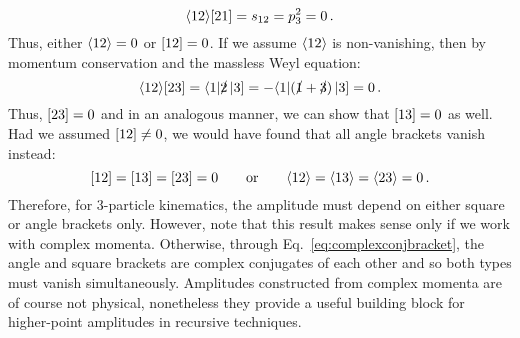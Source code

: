 \documentclass[main.tex]{subfiles}
\begin{document}
\begin{equation}
    \langle 12 \rangle[ 21 ] = s_{12} = p_3^2 = 0\,.
\end{equation}
Thus, either $\langle 12 \rangle = 0$ or $[ 12 ] = 0$. If we assume $\langle 12 \rangle$ is non-vanishing, then by momentum conservation and the massless Weyl equation:
\begin{equation}
    \langle 12 \rangle[ 23 ] = \langle 1|\slashed{2}\left| 3 \right] = -\langle 1|(\slashed{1}+\slashed{3})\left| 3 \right] = 0\,.
\end{equation}
Thus, $[ 23 ] = 0$ and in an analogous manner, we can show that $[ 13 ] = 0$ as well. Had we assumed $[ 12 ] \neq 0$, we would have found that all angle brackets vanish instead:
\begin{equation}
    [ 12 ] = [ 13 ] = [ 23 ] = 0 \qquad \text{or} \qquad \langle 12 \rangle = \langle 13 \rangle = \langle 23 \rangle = 0 \,.
\end{equation}
Therefore, for 3-particle kinematics, the amplitude must depend on either square or angle brackets only. However, note that this result makes sense only if we work with complex momenta. Otherwise, through Eq.~\ref{eq:complexconjbracket}, the angle and square brackets are complex conjugates of each other and so both types must vanish simultaneously. Amplitudes constructed from complex momenta are of course not physical, nonetheless they provide a useful building block for higher-point amplitudes in recursive techniques.
\end{document}
